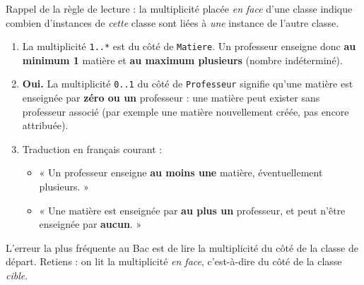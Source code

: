 \documentclass[11pt]{article}
\begin{document}
\begin{corrige}
Rappel de la règle de lecture : la multiplicité placée \emph{en face} d'une classe indique combien d'instances de \emph{cette} classe sont liées à \emph{une} instance de l'autre classe.
\begin{enumerate}
  \item La multiplicité \texttt{1..*} est du côté de \texttt{Matiere}. Un professeur enseigne donc \textbf{au minimum 1} matière et \textbf{au maximum plusieurs} (nombre indéterminé).
  \item \textbf{Oui.} La multiplicité \texttt{0..1} du côté de \texttt{Professeur} signifie qu'une matière est enseignée par \textbf{zéro ou un} professeur : une matière peut exister sans professeur associé (par exemple une matière nouvellement créée, pas encore attribuée).
  \item Traduction en français courant :
  \begin{itemize}
    \item « Un professeur enseigne \textbf{au moins une} matière, éventuellement plusieurs. »
    \item « Une matière est enseignée par \textbf{au plus un} professeur, et peut n'être enseignée par \textbf{aucun}. »
  \end{itemize}
\end{enumerate}
\end{corrige}

\begin{attention}
L'erreur la plus fréquente au Bac est de lire la multiplicité du côté de la classe de départ. Retiens : on lit la multiplicité \emph{en face}, c'est-à-dire du côté de la classe \emph{cible}.
\end{attention}
\end{document}
